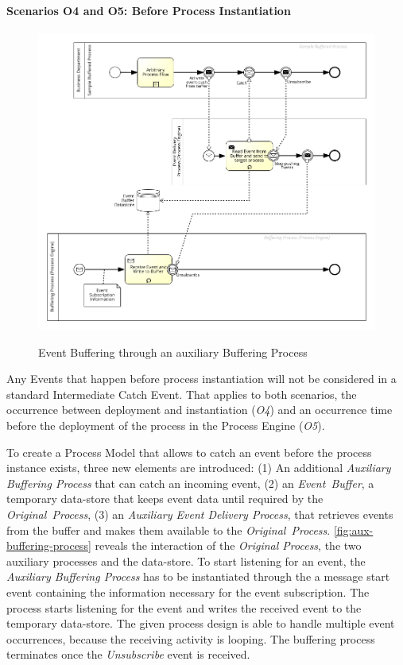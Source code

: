 \paragraph{Scenarios O4 and O5: Before Process Instantiation}
\begin{figure}[]
	\myfloatalign
	{\includegraphics[width=1\linewidth]{chapters/assessment/aux-buffer-process.png}}
	\caption{Event Buffering through an auxiliary Buffering Process}\label{fig:aux-buffering-process}
\end{figure}

Any Events that happen before process instantiation will not be considered in a standard Intermediate Catch Event. That applies to both scenarios, the occurrence between deployment and instantiation (\textit{O4}) and an occurrence time before the deployment of the process in the Process Engine (\textit{O5}).

To create a Process Model that allows to catch an event before the process instance exists, three new elements are introduced: (1) An additional \textit{Auxiliary Buffering Process} that can catch an incoming event, (2) an \textit{Event~Buffer}, a temporary data-store that keeps event data until required by the \textit{Original~Process}, (3) an \textit{Auxiliary Event Delivery Process}, that retrieves events from the buffer and makes them available to the \textit{Original~Process}.
\autoref{fig:aux-buffering-process} reveals the interaction of the \textit{Original Process}, the two auxiliary processes and the data-store. To start listening for an event, the \textit{Auxiliary Buffering Process} has to be instantiated through the a message start event containing the information necessary for the event subscription. The process starts listening for the event and writes the received event to the temporary data-store. 
The given process design is able to handle multiple event occurrences, because the receiving activity is looping. The buffering process terminates once the \textit{Unsubscribe} event is received.

